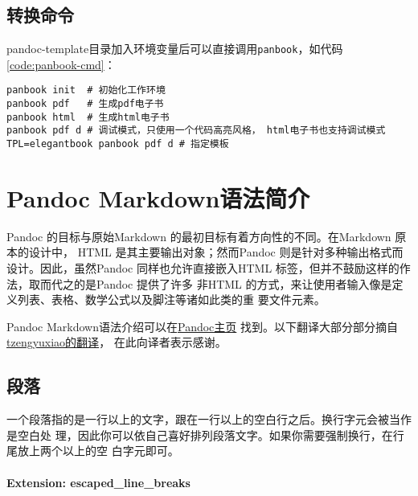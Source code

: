 \documentclass[cn]{elegantbook}
\newcommand{\passthrough}[1]{#1}
\begin{document}
\hypertarget{ux8f6cux6362ux547dux4ee4}{%
\section{转换命令}\label{ux8f6cux6362ux547dux4ee4}}

pandoc-template目录加入环境变量后可以直接调用\passthrough{\lstinline!panbook!}，如代码\ref{code:panbook-cmd}：

\begin{lstlisting}[caption=转换命令, label=code:panbook-cmd, float=htbp]
panbook init  # 初始化工作环境
panbook pdf   # 生成pdf电子书
panbook html  # 生成html电子书
panbook pdf d # 调试模式，只使用一个代码高亮风格， html电子书也支持调试模式
TPL=elegantbook panbook pdf d # 指定模板
\end{lstlisting}

\hypertarget{pandoc-markdownux8bedux6cd5ux7b80ux4ecb}{%
\chapter{Pandoc
Markdown语法简介}\label{pandoc-markdownux8bedux6cd5ux7b80ux4ecb}}

Pandoc 的目标与原始Markdown 的最初目标有着方向性的不同。在Markdown
原本的设计中， HTML 是其主要输出对象；然而Pandoc
则是针对多种输出格式而设计。因此，虽然Pandoc 同样也允许直接嵌入HTML
标签，但并不鼓励这样的作法，取而代之的是Pandoc 提供了许多 非HTML
的方式，来让使用者输入像是定义列表、表格、数学公式以及脚注等诸如此类的重
要文件元素。

Pandoc
Markdown语法介绍可以在\href{http://www.pandoc.org/MANUAL.html\#pandocs-markdown}{Pandoc主页}
找到。以下翻译大部分部分摘自\href{http://pages.tzengyuxio.me/pandoc/}{tzengyuxiao的翻译}，
在此向译者表示感谢。

\hypertarget{ux6bb5ux843d}{%
\section{段落}\label{ux6bb5ux843d}}

一个段落指的是一行以上的文字，跟在一行以上的空白行之后。换行字元会被当作是空白处
理，因此你可以依自己喜好排列段落文字。如果你需要强制换行，在行尾放上两个以上的空
白字元即可。

\hypertarget{extension-escaped_line_breaks}{%
\subsubsection{Extension:
escaped\_line\_breaks}\label{extension-escaped_line_breaks}}
\end{document}
